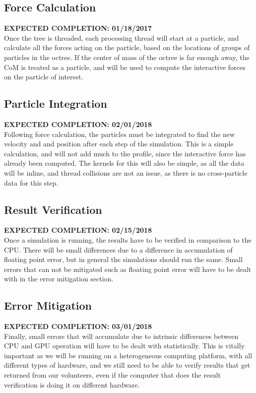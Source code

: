 \documentclass[fleqn,10pt]{SelfArx} %
\begin{document}
\subsection{Force Calculation}
\textbf{EXPECTED COMPLETION: 01/18/2017}\\
Once the tree is threaded, each processing thread will start at a particle, and calculate all the forces acting on the particle, based on the locations of groups of particles in the octree. If the center of mass of the octree is far enough away, the CoM is treated as a particle, and will be used to compute the interactive forces on the particle of interest.

\subsection{Particle Integration}
\textbf{EXPECTED COMPLETION: 02/01/2018}\\
Following force calculation, the particles must be integrated to find the new velocity and and position after each step of the simulation. This is a simple calculation, and will not add much to the profile, since the interactive force has already been computed. The kernels for this will also be simple, as all the data will be inline, and thread collisions are not an issue, as there is no cross-particle data for this step.

\subsection{Result Verification}
\textbf{EXPECTED COMPLETION: 02/15/2018}\\
Once a simulation is running, the results have to be verified in comparison to the CPU. There will be small differences due to a difference in accumulation of floating point error, but in general the simulations should run the same. Small errors that can not be mitigated such as floating point error will have to be dealt with in the error mitigation section.

\subsection{Error Mitigation}
\textbf{EXPECTED COMPLETION: 03/01/2018}\\
Finally, small errors that will accumulate due to intrinsic differences between CPU and GPU operation will have to be dealt with statistically. This is vitally important as we will be running on a heterogeneous computing platform, with all different types of hardware, and we still need to be able to verify results that get returned from our volunteers, even if the computer that does the result verification is doing it on different hardware.
\end{document}
